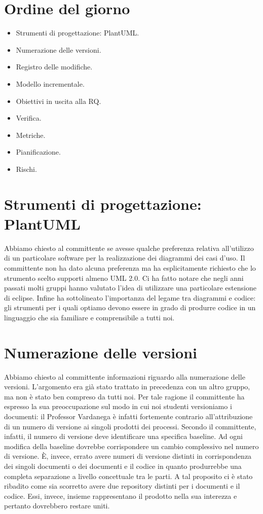 \documentclass{article}
\begin{document}
\section{Ordine del giorno}%
\label{sec:ordine_del_giorno}

\begin{itemize}
  \item Strumenti di progettazione: PlantUML\@.
  \item Numerazione delle versioni.
  \item Registro delle modifiche.
  \item Modello incrementale.
  \item Obiettivi in uscita alla RQ\@.
  \item Verifica.
  \item Metriche.
  \item Pianificazione.
  \item Rischi.
\end{itemize}

\section{Strumenti di progettazione: PlantUML}%
\label{sec:strumenti_di_progettazione_plantuml}

Abbiamo chiesto al committente se avesse qualche preferenza relativa all'utilizzo di un particolare software per la realizzazione dei diagrammi dei casi d'uso. Il committente non ha dato alcuna preferenza ma ha esplicitamente richiesto che lo strumento scelto supporti almeno UML 2.0. Ci ha fatto notare che negli anni passati molti gruppi hanno valutato l'idea di utilizzare una particolare estensione di eclipse. Infine ha sottolineato l'importanza del legame tra diagrammi e codice: gli strumenti per i quali optiamo devono essere in grado di produrre codice in un linguaggio che sia familiare e comprensibile a tutti noi.

\section{Numerazione delle versioni}%
\label{sec:numerazione_delle_versioni}

Abbiamo chiesto al committente informazioni riguardo alla numerazione delle versioni. L'argomento era già stato trattato in precedenza con un altro gruppo, ma non è stato ben compreso da tutti noi. Per tale ragione il committente ha espresso la sua preoccupazione sul modo in cui noi studenti versioniamo i documenti: il Professor Vardanega è infatti fortemente contrario all'attribuzione di un numero di versione ai singoli prodotti dei processi. Secondo il committente, infatti, il numero di versione deve identificare una specifica baseline. Ad ogni modifica della baseline dovrebbe corrispondere un cambio complessivo nel numero di versione. È, invece, errato  avere numeri di versione distinti in corrispondenza dei singoli documenti o dei documenti e il codice in quanto produrrebbe una completa separazione a livello concettuale tra le parti. A tal proposito ci è stato ribadito come sia scorretto avere due repository distinti per i documenti e il codice. Essi, invece, insieme rappresentano il prodotto nella sua interezza e pertanto dovrebbero restare uniti.
\end{document}

